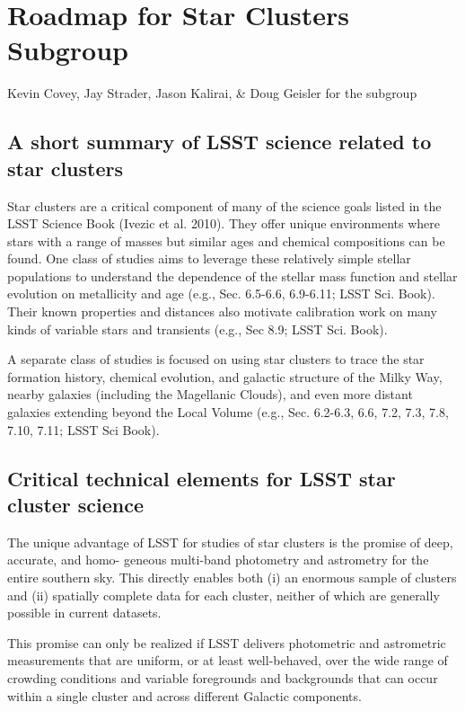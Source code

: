 \section{Roadmap for Star Clusters Subgroup}

Kevin Covey, Jay Strader, Jason Kalirai, \& Doug Geisler for the subgroup 

\subsection{A short summary of LSST science related to star clusters }

Star clusters are a critical component of many of the science goals listed in the LSST Science Book (Ivezic et al. 2010). They offer unique environments where stars with a range of masses but similar ages and chemical compositions can be found. One class of studies aims to leverage these relatively simple stellar populations to understand the dependence of the stellar mass function and stellar evolution on metallicity and age (e.g., Sec. 6.5-6.6, 6.9-6.11; LSST Sci. Book). Their known properties and distances also motivate calibration work on many kinds of variable stars and transients (e.g., Sec 8.9; LSST Sci. Book). 

A separate class of studies is focused on using star clusters to trace the star formation history, chemical evolution, and galactic structure of the Milky Way, nearby galaxies (including the Magellanic Clouds), and even more distant galaxies extending beyond the Local Volume (e.g., Sec. 6.2-6.3, 6.6, 7.2, 7.3, 7.8, 7.10, 7.11; LSST Sci Book). 

\subsection{Critical technical elements for LSST star cluster science }

The unique advantage of LSST for studies of star clusters is the promise of deep, accurate, and homo- geneous multi-band photometry and astrometry for the entire southern sky. This directly enables both (i) an enormous sample of clusters and (ii) spatially complete data for each cluster, neither of which are generally possible in current datasets. 

This promise can only be realized if LSST delivers photometric and astrometric measurements that are uniform, or at least well-behaved, over the wide range of crowding conditions and variable foregrounds and backgrounds that can occur within a single cluster and across different Galactic components. 

